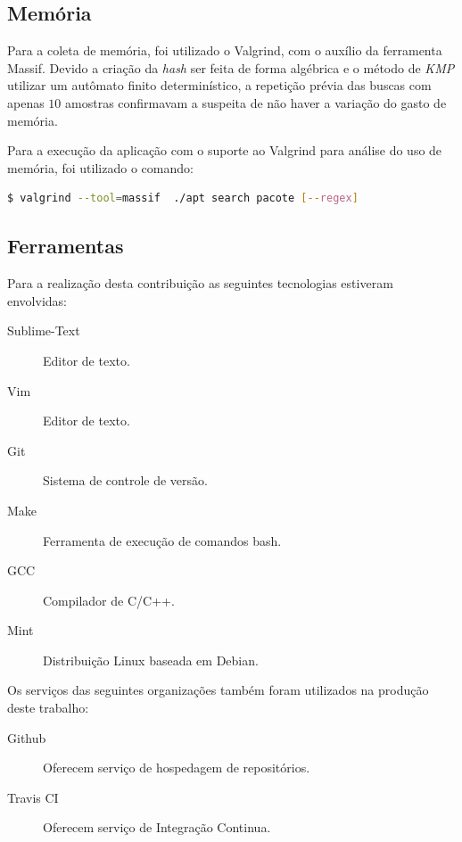 \subsection*{Memória}

Para a coleta de memória, foi utilizado o {\code Valgrind}, com o auxílio da ferramenta {\code Massif}. Devido a criação da \textit{hash} ser feita de forma  algébrica e o método de \textit{KMP} utilizar um autômato finito determinístico, a repetição prévia das buscas com apenas $10$ amostras confirmavam a suspeita de não haver a variação do gasto de memória.

Para a execução da aplicação com o suporte ao {\code Valgrind} para análise do uso de memória, foi utilizado o comando:

\begin{lstlisting}[language=Bash,label=valgrind_call, numbers=none]
   $ valgrind --tool=massif  ./apt search pacote [--regex]
\end{lstlisting}


\subsection{Ferramentas}

Para a realização desta contribuição as seguintes tecnologias estiveram envolvidas:

\begin{description}
	\item[Sublime-Text] Editor de texto.
	\item[Vim] Editor de texto.
	\item[Git] Sistema de controle de versão.
	\item[Make] Ferramenta de execução de comandos {\code bash}.
	\item[GCC] Compilador de C/C++.
	\item[Mint] Distribuição Linux baseada em Debian.
\end{description}

Os serviços das seguintes organizações também foram utilizados na produção deste trabalho:

\begin{description}
	\item[Github] Oferecem serviço de hospedagem de repositórios.
	\item[Travis CI] Oferecem serviço de Integração Continua.
\end{description}

